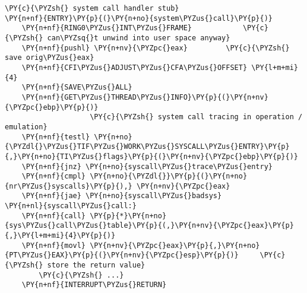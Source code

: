 \begin{Verbatim}[commandchars=\\\{\}]
	\PY{c}{\PYZsh{} system call handler stub}
\PY{n+nf}{ENTRY}\PY{p}{(}\PY{n+no}{system\PYZus{}call}\PY{p}{)}
	\PY{n+nf}{RING0\PYZus{}INT\PYZus{}FRAME}			\PY{c}{\PYZsh{} can\PYZsq{}t unwind into user space anyway}
	\PY{n+nf}{pushl} \PY{n+nv}{\PYZpc{}eax}			\PY{c}{\PYZsh{} save orig\PYZus{}eax}
	\PY{n+nf}{CFI\PYZus{}ADJUST\PYZus{}CFA\PYZus{}OFFSET} \PY{l+m+mi}{4}
	\PY{n+nf}{SAVE\PYZus{}ALL}
	\PY{n+nf}{GET\PYZus{}THREAD\PYZus{}INFO}\PY{p}{(}\PY{n+nv}{\PYZpc{}ebp}\PY{p}{)}
					\PY{c}{\PYZsh{} system call tracing in operation / emulation}
	\PY{n+nf}{testl} \PY{n+no}{\PYZdl{}\PYZus{}TIF\PYZus{}WORK\PYZus{}SYSCALL\PYZus{}ENTRY}\PY{p}{,}\PY{n+no}{TI\PYZus{}flags}\PY{p}{(}\PY{n+nv}{\PYZpc{}ebp}\PY{p}{)}
	\PY{n+nf}{jnz} \PY{n+no}{syscall\PYZus{}trace\PYZus{}entry}
	\PY{n+nf}{cmpl} \PY{n+no}{\PYZdl{}}\PY{p}{(}\PY{n+no}{nr\PYZus{}syscalls}\PY{p}{),} \PY{n+nv}{\PYZpc{}eax}
	\PY{n+nf}{jae} \PY{n+no}{syscall\PYZus{}badsys}
\PY{n+nl}{syscall\PYZus{}call:}
	\PY{n+nf}{call} \PY{p}{*}\PY{n+no}{sys\PYZus{}call\PYZus{}table}\PY{p}{(,}\PY{n+nv}{\PYZpc{}eax}\PY{p}{,}\PY{l+m+mi}{4}\PY{p}{)}
	\PY{n+nf}{movl} \PY{n+nv}{\PYZpc{}eax}\PY{p}{,}\PY{n+no}{PT\PYZus{}EAX}\PY{p}{(}\PY{n+nv}{\PYZpc{}esp}\PY{p}{)}		\PY{c}{\PYZsh{} store the return value}
        \PY{c}{\PYZsh{} ...}
	\PY{n+nf}{INTERRUPT\PYZus{}RETURN}
\end{Verbatim}
